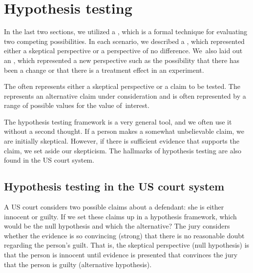\section{Hypothesis testing}
\label{HypothesisTesting}

In the last two sections, we utilized a , which is a formal technique for evaluating two competing possibilities. In each scenario, we described a , which represented either a skeptical perspective or a perspective of no difference. We~also laid out an , which represented a new perspective such as the possibility that there has been a change or that there is a treatment effect in an experiment.

\begin{termBox}{
The  often represents either a skeptical perspective or a claim to be tested. The  represents an alternative claim under consideration and is often represented by a range of possible values for the value of~interest.}
\end{termBox}

The hypothesis testing framework is a very general tool, and we often use it without a second thought. If a person makes a somewhat unbelievable claim, we are initially skeptical. However, if there is sufficient evidence that supports the claim, we set aside our skepticism. The hallmarks of hypothesis testing are also found in the US court system. 

\subsection{Hypothesis testing in the US court system}

\begin{example}{A US court considers two possible claims about a defendant: she is either innocent or guilty. If we set these claims up in a hypothesis framework, which would be the null hypothesis and which the alternative?}\label{hypTestCourtExample}
The jury considers whether the evidence is so convincing (strong) that there is no reasonable doubt regarding the person's guilt. That is, the skeptical perspective (null hypothesis) is that the person is innocent until evidence is presented that convinces the jury that the person is guilty (alternative hypothesis).
\end{example}

